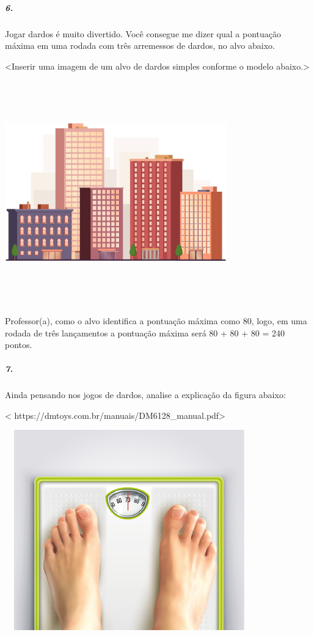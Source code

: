 \subparagraph{6.}\label{section-19}

Jogar dardos é muito divertido. Você consegue me dizer qual a pontuação
máxima em uma rodada com três arremessos de dardos, no alvo abaixo.

\textless{}Inserir uma imagem de um alvo de dardos simples conforme o
modelo abaixo.\textgreater{}

\includegraphics[width=3.78624in,height=3.80208in]{media/image31.png}

Professor(a), como o alvo identifica a pontuação máxima como 80, logo,
em uma rodada de três lançamentos a pontuação máxima será 80 + 80 + 80 =
240 pontos.

\subparagraph{7.}\label{section-20}

Ainda pensando nos jogos de dardos, analise a explicação da figura
abaixo:

\textless{}
https://dmtoys.com.br/manuais/DM6128\_manual.pdf\textgreater{}

\includegraphics[width=4.23958in,height=3.41667in]{media/image32.png}

